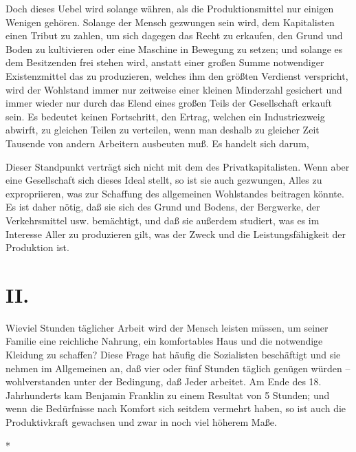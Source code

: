 \documentclass{scrbook}
\begin{document}
Doch dieses Uebel wird solange währen, als die Produktionsmittel nur einigen Wenigen gehören. Solange der Mensch gezwungen sein wird, dem Kapitalisten einen Tribut zu zahlen, um sich dagegen das Recht zu erkaufen, den Grund und Boden zu kultivieren oder eine Maschine in Bewegung zu setzen; und solange es dem Besitzenden frei stehen wird, anstatt einer großen Summe notwendiger Existenzmittel das zu produzieren, welches ihm den größten Verdienst verspricht, wird der Wohlstand immer nur zeitweise einer kleinen Minderzahl gesichert und immer wieder nur durch das Elend eines großen Teils der Gesellschaft erkauft sein. Es bedeutet keinen Fortschritt, den Ertrag, welchen ein Industriezweig abwirft, zu gleichen Teilen zu verteilen, wenn man deshalb zu gleicher Zeit Tausende von andern Arbeitern ausbeuten muß. Es handelt sich darum, 

Dieser Standpunkt verträgt sich nicht mit dem des Privatkapitalisten. Wenn aber eine Gesellschaft sich dieses Ideal stellt, so ist sie auch gezwungen, Alles zu expropriieren, was zur Schaffung des allgemeinen Wohlstandes beitragen könnte. Es ist daher nötig, daß sie sich des Grund und Bodens, der Bergwerke, der Verkehrsmittel usw. bemächtigt, und daß sie außerdem studiert, was es im Interesse Aller zu produzieren gilt, was der Zweck und die Leistungsfähigkeit der Produktion ist.

\section*{II.}

Wieviel Stunden täglicher Arbeit wird der Mensch leisten müssen, um seiner Familie eine reichliche Nahrung, ein komfortables Haus und die notwendige Kleidung zu schaffen? Diese Frage hat häufig die Sozialisten beschäftigt und sie nehmen im Allgemeinen an, daß vier oder fünf Stunden täglich genügen würden – wohlverstanden unter der Bedingung, daß Jeder arbeitet. Am Ende des 18. Jahrhunderts kam Benjamin Franklin zu einem Resultat von 5 Stunden; und wenn die Bedürfnisse nach Komfort sich seitdem vermehrt haben, so ist auch die Produktivkraft gewachsen und zwar in noch viel höherem Maße.

\begin{center}*\end{center}
\end{document}
